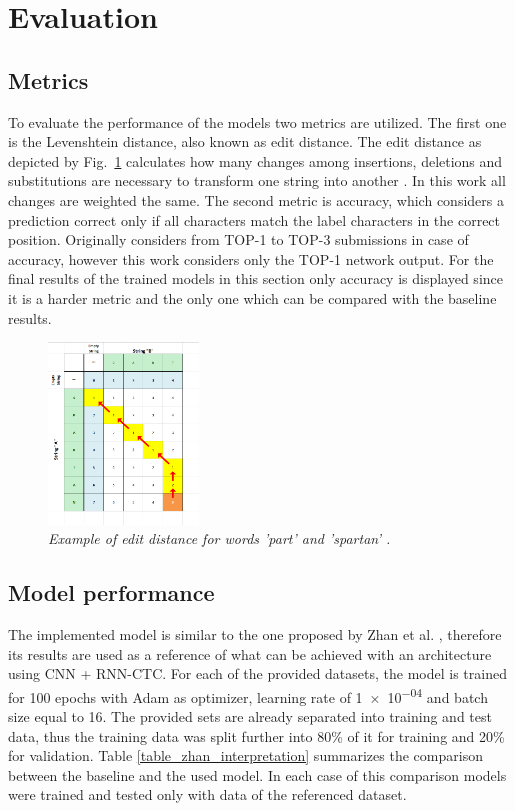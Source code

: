 \section{Evaluation}\label{sec:evaluation}

\subsection{Metrics}

To evaluate the performance of the models two metrics are utilized. The first
one is the Levenshtein distance, also known as edit distance. The edit distance
as depicted by Fig.~\ref{fig_edit_distance} calculates how many changes among
insertions, deletions and substitutions are necessary to transform one string
into another \cite{rice_edit_dist}. In this work all changes are weighted the
same. The second metric is accuracy, which considers a prediction correct only
if all characters match the label characters in the correct position. Originally
\cite{icfhr_competition} considers from TOP-1 to TOP-3 submissions in case of
accuracy, however this work considers only the TOP-1 network output. For the
final results of the trained models in this section only accuracy is displayed
since it is a harder metric and the only one which can be compared with the
baseline results. 

\begin{figure}[t]
\centerline{\includegraphics[width=40mm]{images/edit_distance}}
\caption{{\it Example of edit distance for words 'part' and 'spartan' \cite{rice_edit_dist}.}}  
\label{fig_edit_distance}
\end{figure}

\subsection{Model performance}

The implemented model is similar to the one proposed by Zhan et al.
\cite{zhan2017}, therefore its results are used as a reference of what can be
achieved with an architecture using CNN + RNN-CTC. For each of the provided
datasets, the model is trained for 100 epochs with Adam as optimizer, learning
rate of \num{1e-04} and batch size equal to 16. The provided sets are already
separated into training and test data, thus the training data was split further
into 80\% of it for training and 20\% for validation. Table
\ref{table_zhan_interpretation} summarizes the comparison between the baseline
and the used model. In each case of this comparison models were trained and
tested only with data of the referenced dataset. 

